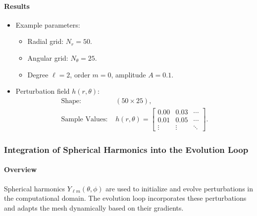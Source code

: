 \documentclass[12pt]{article}
\begin{document}
\paragraph{Results}
\begin{itemize}
    \item Example parameters:
    \begin{itemize}
        \item Radial grid: $N_r = 50$.
        \item Angular grid: $N_\theta = 25$.
        \item Degree $\ell = 2$, order $m = 0$, amplitude $A = 0.1$.
    \end{itemize}
    \item Perturbation field $h(r, \theta)$:
    \begin{align*}
    \text{Shape: } & (50 \times 25), \\
    \text{Sample Values: } & h(r, \theta) = \begin{bmatrix}
        0.00 & 0.03 & \cdots \\
        0.01 & 0.05 & \cdots \\
        \vdots & \vdots & \ddots
    \end{bmatrix}.
    \end{align*}
\end{itemize}

\subsubsection{Integration of Spherical Harmonics into the Evolution Loop}

\paragraph{Overview}
Spherical harmonics $Y_{\ell m}(\theta, \phi)$ are used to initialize and evolve perturbations in the computational domain. The evolution loop incorporates these perturbations and adapts the mesh dynamically based on their gradients.
\end{document}
